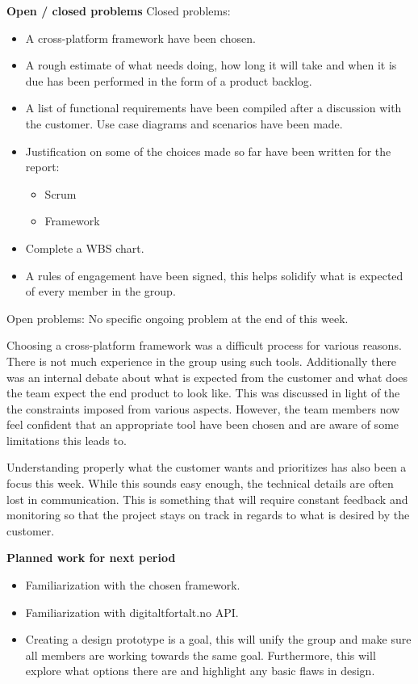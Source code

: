 \begin{appendices}
		\textbf{Open / closed problems}\newline
		Closed problems:
		\begin{itemize}
			\item A cross-platform framework have been chosen.
			\item A rough estimate of what needs doing, how long it will take and when it is due has been performed in the form of a product backlog.
			\item A list of functional requirements have been compiled after a discussion with the customer.
			Use case diagrams and scenarios have been made.
			\item Justification on some of the choices made so far have been written for the report:
			\begin{itemize}
				\item Scrum
				\item Framework
			\end{itemize}
			\item Complete a WBS chart.
			\item A rules of engagement have been signed, this helps solidify what is expected of every member in the group.\newline
		\end{itemize}
		
		Open problems:\newline
		No specific ongoing problem at the end of this week.\newline
		
		Choosing a cross-platform framework was a difficult process for various reasons. There is not much experience in the group using such tools. Additionally there was an internal debate about what is expected from the customer and what does the team expect the end product to look like. This was discussed in light of the the constraints imposed from various aspects. However, the team members now feel confident that an appropriate tool have been chosen and are aware of some limitations this leads to.\newline
		
		Understanding properly what the customer wants and prioritizes has also been a focus this week. While this sounds easy enough, the technical details are often lost in communication. This is something that will require constant feedback and monitoring so that the project stays on track in regards to what is desired by the customer.\newline
		
		\textbf{Planned work for next period}\newline
		\begin{itemize}
			\item Familiarization with the chosen framework.
			\item Familiarization with digitaltfortalt.no API.
			\item Creating a design prototype is a goal, this will unify the group and make sure all members are working towards the same goal. Furthermore, this will explore what options there are and highlight any basic flaws in design.
		\end{itemize}
\raggedbottom
\newpage


\end{appendices}
